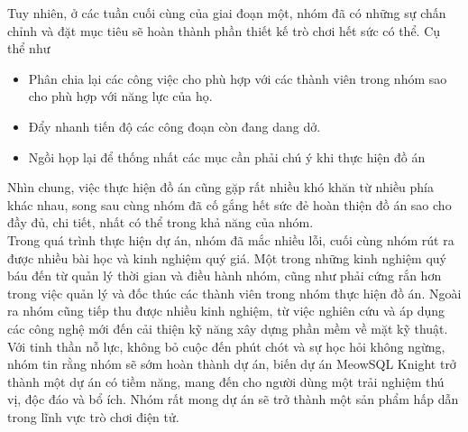\hspace*{0.5cm} Tuy nhiên, ở các tuần cuối cùng của giai đoạn một, nhóm đã có những sự chấn chỉnh và đặt mục tiêu sẽ hoàn thành phần thiết kế trò chơi hết sức có thể. Cụ thể như
\begin{itemize}
	\item Phân chia lại các công việc cho phù hợp với các thành viên trong nhóm sao cho phù hợp với năng lực của họ. 
	\item Đẩy nhanh tiến độ các công đoạn còn đang dang dở.
	\item Ngồi họp lại để thống nhất các mục cần phải chú ý khi thực hiện đồ án
\end{itemize}
\hspace*{0.5cm} Nhìn chung, việc thực hiện đồ án cũng gặp rất nhiều khó khăn từ nhiều phía khác nhau, song sau cùng nhóm đã cố gắng hết sức đẻ hoàn thiện đồ án sao cho đầy đủ, chi tiết, nhất có thể trong khả năng của nhóm.\\
\hspace*{0.5cm} Trong quá trình thực hiện dự án, nhóm đã mắc nhiều lỗi, cuối cùng nhóm rút ra được nhiều bài học và kinh nghiệm quý giá. Một trong những kinh nghiệm quý báu đến từ quản lý thời gian và điều hành nhóm, cũng như phải cứng rắn hơn trong việc quản lý và đốc thúc các thành viên trong nhóm thực hiện đồ án. Ngoài ra nhóm cũng tiếp thu được nhiều kinh nghiệm, từ việc nghiên cứu và áp dụng các công nghệ mới đến cải thiện kỹ năng xây dựng phần mềm về mặt kỹ thuật.\\

\hspace*{0.5cm} Với tinh thần nỗ lực, không bỏ cuộc đến phút chót và sự học hỏi không ngừng, nhóm tin rằng nhóm sẽ sớm hoàn thành dự án, biến dự án MeowSQL Knight trở thành một dự án có tiềm năng, mang đến cho người dùng một trải nghiệm thú vị, độc đáo và bổ ích. Nhóm rất mong dự án sẽ trở thành một sản phẩm hấp dẫn trong lĩnh vực trò chơi điện tử.

